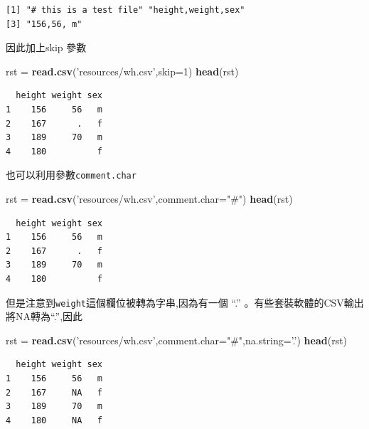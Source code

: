 \documentclass[]{book}
\newenvironment{Shaded}{\begin{snugshade}}{\end{snugshade}}
\newcommand{\DataTypeTok}[1]{\textcolor[rgb]{0.13,0.29,0.53}{#1}}
\newcommand{\DecValTok}[1]{\textcolor[rgb]{0.00,0.00,0.81}{#1}}
\newcommand{\KeywordTok}[1]{\textcolor[rgb]{0.13,0.29,0.53}{\textbf{#1}}}
\newcommand{\NormalTok}[1]{#1}
\newcommand{\StringTok}[1]{\textcolor[rgb]{0.31,0.60,0.02}{#1}}
\theoremstyle{definition}
\theoremstyle{definition}
\theoremstyle{definition}
\theoremstyle{remark}
\begin{document}
\begin{verbatim}
[1] "# this is a test file" "height,weight,sex"    
[3] "156,56, m"            
\end{verbatim}

因此加上skip 參數

\begin{Shaded}
\begin{Highlighting}[]
\NormalTok{rst =}\StringTok{ }\KeywordTok{read.csv}\NormalTok{(}\StringTok{'resources/wh.csv'}\NormalTok{,}\DataTypeTok{skip=}\DecValTok{1}\NormalTok{)}
\KeywordTok{head}\NormalTok{(rst)}
\end{Highlighting}
\end{Shaded}

\begin{verbatim}
  height weight sex
1    156     56   m
2    167      .   f
3    189     70   m
4    180          f
\end{verbatim}

也可以利用參數\texttt{comment.char}

\begin{Shaded}
\begin{Highlighting}[]
\NormalTok{rst =}\StringTok{ }\KeywordTok{read.csv}\NormalTok{(}\StringTok{'resources/wh.csv'}\NormalTok{,}\DataTypeTok{comment.char=}\StringTok{"#"}\NormalTok{)}
\KeywordTok{head}\NormalTok{(rst)}
\end{Highlighting}
\end{Shaded}

\begin{verbatim}
  height weight sex
1    156     56   m
2    167      .   f
3    189     70   m
4    180          f
\end{verbatim}

但是注意到\texttt{weight}這個欄位被轉為字串,因為有一個 ``.''
。有些套裝軟體的CSV輸出將NA轉為``.'',因此

\begin{Shaded}
\begin{Highlighting}[]
\NormalTok{rst =}\StringTok{ }\KeywordTok{read.csv}\NormalTok{(}\StringTok{'resources/wh.csv'}\NormalTok{,}\DataTypeTok{comment.char=}\StringTok{"#"}\NormalTok{,}\DataTypeTok{na.string=}\StringTok{'.'}\NormalTok{)}
\KeywordTok{head}\NormalTok{(rst)}
\end{Highlighting}
\end{Shaded}

\begin{verbatim}
  height weight sex
1    156     56   m
2    167     NA   f
3    189     70   m
4    180     NA   f
\end{verbatim}
\end{document}
